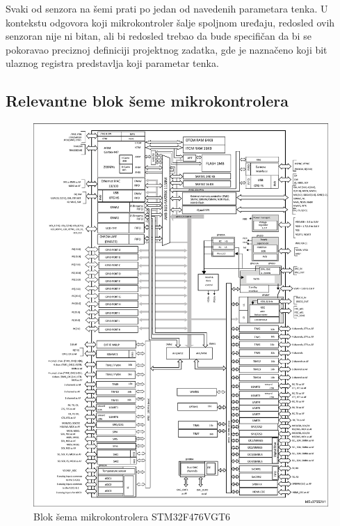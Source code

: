\documentclass[a4paper, 12pt, oneside, titlepage]{article}
\begin{document}
      Svaki od senzora na šemi prati po jedan od navedenih parametara tenka. U kontekstu odgovora koji mikrokontroler šalje spoljnom uređaju, redosled ovih senzoran nije ni bitan,
      ali bi redosled trebao da bude specifičan da bi se pokoravao preciznoj definiciji projektnog zadatka, gde je naznačeno koji bit ulaznog registra predstavlja koji parametar
      tenka.
      
      \subsection{Relevantne blok šeme mikrokontrolera}
      \begin{figure}[H]
        \centering
        \includegraphics[height=0.9\textheight]{slike/blok_mikrokontroler}
        \caption{Blok šema mikrokontrolera STM32F476VGT6}
        \label{fig:blok_mikrokontroler} %
      \end{figure}
      
\end{document}
